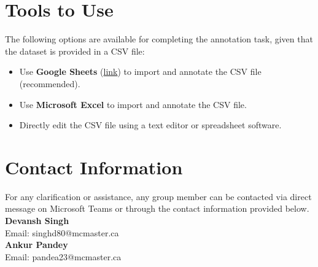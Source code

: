 \documentclass[12pt]{article}
\begin{document}
\section{Tools to Use}  
The following options are available for completing the annotation task, given that the dataset is provided in a CSV file:  

\begin{itemize}  
    \item Use \textbf{Google Sheets} (\href{https://workspace.google.com/intl/en_ca/products/sheets/}{link}) to import and annotate the CSV file (recommended).  
    \item Use \textbf{Microsoft Excel} to import and annotate the CSV file.  
    \item Directly edit the CSV file using a text editor or spreadsheet software.  

\end{itemize}  

\section{Contact Information}
For any clarification or assistance, any group member can be contacted via direct message on Microsoft Teams or 
through the contact information provided below.\\
\noindent
\textbf{Devansh Singh} \\
Email: singhd80@mcmaster.ca \\
\noindent
\textbf{Ankur Pandey} \\
Email: pandea23@mcmaster.ca
\end{document}

